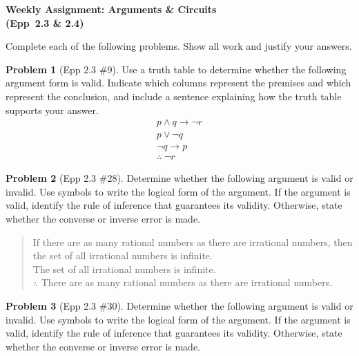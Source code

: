 \documentclass[11pt]{article}
\begin{document}
\begin{center}
  {\Large\bfseries Weekly Assignment: Arguments \& Circuits\\[2pt]
   (Epp~2.3 \& 2.4)}
\end{center}

\bigskip

\noindent
Complete each of the following problems.  Show all work and justify your answers.

\bigskip

\noindent\textbf{Problem 1} (Epp 2.3 \#9). \;
Use a truth table to determine whether the following argument
form is valid.  Indicate which columns represent the premises
and which represent the conclusion, and include a sentence
explaining how the truth table supports your answer.
\[
  \begin{array}{l}
    p \land q \to \lnot r \\
    p \lor \lnot q \\
    \lnot q \to p \\
    \hline
    \therefore\; \lnot r
  \end{array}
\]

\bigskip

\noindent\textbf{Problem 2} (Epp 2.3 \#28). \;
Determine whether the following argument is valid or invalid.
Use symbols to write the logical form of the argument.
If the argument is valid, identify the rule of inference
that guarantees its validity.  Otherwise, state whether the
converse or inverse error is made.

\begin{quote}
  If there are as many rational numbers as there are irrational
  numbers, then the set of all irrational numbers is infinite.\\
  The set of all irrational numbers is infinite.\\
  $\therefore$ There are as many rational numbers as there are
  irrational numbers.
\end{quote}

\bigskip

\noindent\textbf{Problem 3} (Epp 2.3 \#30). \;
Determine whether the following argument is valid or invalid.
Use symbols to write the logical form of the argument.
If the argument is valid, identify the rule of inference
that guarantees its validity.  Otherwise, state whether the
converse or inverse error is made.
\end{document}
